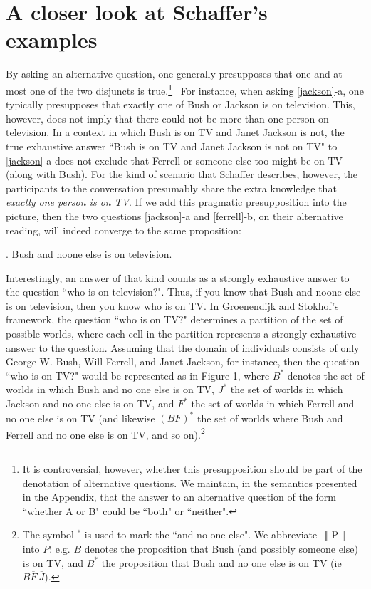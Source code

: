 \section{A closer look at Schaffer's examples}


By asking an alternative question, one generally presupposes that
one and at most one of the two disjuncts is true.\footnote{It is
controversial, however, whether this presupposition should be part
of the denotation of alternative questions. We maintain, in the
semantics presented in the Appendix, that the answer to an
alternative question of the form ``whether A or B" could be
``both" or ``neither".} \ For instance, when asking
\ref{jackson}-a, one typically presupposes that exactly one of
Bush or Jackson is on television. This, however, does not imply
that there could not be more than one person on television. In a
context in which Bush is on TV and Janet Jackson is not, the true
exhaustive answer ``Bush is on TV and Janet Jackson is not on TV"
to \ref{jackson}-a does not exclude that Ferrell or someone else
too might be on TV (along with Bush). For the kind of scenario
that Schaffer describes, however, the participants to the
conversation presumably share the extra knowledge that
\emph{exactly one person is on TV}. If we add this pragmatic
presupposition into the picture, then the two questions
\ref{jackson}-a and \ref{ferrell}-b, on their alternative reading,
will indeed converge to the same proposition:

\ex. \label{noone} Bush and noone else is on television.

%

Interestingly, an answer of that kind counts as a strongly
exhaustive answer to the question ``who is on television?". Thus,
if you know that Bush and noone else is on television, then you
know who is on TV. In Groenendijk and Stokhof's framework, the
question ``who is on TV?" determines a partition of the set of
possible worlds, where each cell in the partition represents a
strongly exhaustive answer to the question. Assuming that the
domain of individuals consists of only George W. Bush, Will
Ferrell, and Janet Jackson, for instance, then the question ``who
is on TV?" would be represented as in Figure 1, where $B^{*}$
denotes the set of worlds in which Bush and no one else is on TV,
$J^{*}$ the set of worlds in which Jackson and no one else is on
TV, and $F^{*}$ the set of worlds in which Ferrell and no one else
is on TV (and likewise $(BF)^{*}$ the set of worlds where Bush and
Ferrell and no one else is on TV, and so on).\footnote{The symbol
$^*$ is used to mark the ``and no one else". We abbreviate
$\mbox{ $[\![$ P $]\!]$}$ into $P$: e.g. $B$ denotes the proposition that Bush
(and possibly someone else) is on TV, and $B^{*}$ the proposition
that Bush and no one else is on TV (ie $B \overline{F}\
\overline{J}$).}

